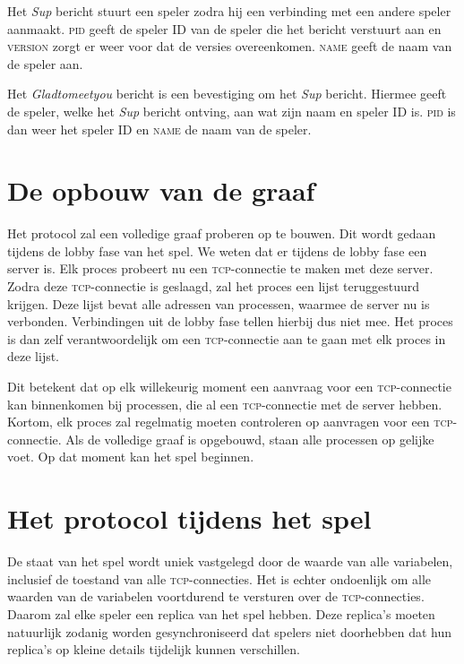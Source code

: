 \documentclass[a4paper,11pt]{article}
\newcommand{\bericht}[1]{
{\begin{center}

\colorbox{YellowGreen!20}{\makebox[\textwidth][c]{{
\textsc{#1}
}}}
\end{center}
}}
\newcommand{\tcp}{\textsc{tcp}\xspace}
\begin{document}
Het \emph{Sup} bericht stuurt een speler zodra hij een verbinding met een andere speler aanmaakt. \textsc{pid} geeft de speler ID van de speler die het bericht verstuurt aan en \textsc{version} zorgt er weer voor dat de versies overeenkomen. \textsc{name} geeft de naam van de speler aan.
\bericht{SUP, pid, version :name.}

Het \emph{Gladtomeetyou} bericht is een bevestiging om het \emph{Sup} bericht. Hiermee geeft de speler, welke het \emph{Sup} bericht ontving, aan wat zijn naam en speler ID is. \textsc{pid} is dan weer het speler ID en \textsc{name} de naam van de speler.
\bericht{GLADTOMEETYOU, pid :name}


    \section{De opbouw van de graaf}
    Het protocol zal een volledige graaf proberen op te bouwen. Dit wordt gedaan tijdens de lobby fase van het spel. We weten dat er tijdens de lobby fase een server is. Elk proces probeert nu een \tcp-connectie te maken met deze server. Zodra deze \tcp-connectie is geslaagd, zal het proces een lijst teruggestuurd krijgen. Deze lijst bevat alle adressen van processen, waarmee de server nu is verbonden. Verbindingen uit de lobby fase tellen hierbij dus niet mee. Het proces is dan zelf verantwoordelijk om een \tcp-connectie aan te gaan met elk proces in deze lijst.

    Dit betekent dat op elk willekeurig moment een aanvraag voor een \tcp-connectie kan binnenkomen bij processen, die al een \tcp-connectie met de server hebben. Kortom, elk proces zal regelmatig moeten controleren op aanvragen voor een \tcp-connectie. Als de volledige graaf is opgebouwd, staan alle processen op gelijke voet. Op dat moment kan het spel beginnen.

    \section{Het protocol tijdens het spel}
    De staat van het spel wordt uniek vastgelegd door de waarde van alle variabelen, inclusief de toestand van alle \tcp-connecties. Het is echter ondoenlijk om alle waarden van de variabelen voortdurend te versturen over de \tcp-connecties. Daarom zal elke speler een replica van het spel hebben. Deze replica's moeten natuurlijk zodanig worden gesynchroniseerd dat spelers niet doorhebben dat hun replica's op kleine details tijdelijk kunnen verschillen.
\end{document}

